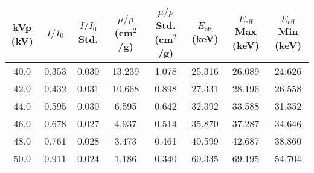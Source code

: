 \begin{tabular}{cccccccc}
\toprule
 kVp (kV) &  $I/I_0$ &  $I/I_0$ Std. &  $\mu/\rho$ (cm$^2$/g) &  $\mu/\rho$ Std. (cm$^2$/g) &  $E_{\text{eff}}$ (keV) &  $E_{\text{eff}}$ Max (keV) &  $E_{\text{eff}}$ Min (keV) \\
\midrule
     40.0 &    0.353 &         0.030 &                 13.239 &                       1.078 &                  25.316 &                      26.089 &                      24.626 \\
     42.0 &    0.432 &         0.031 &                 10.668 &                       0.898 &                  27.331 &                      28.196 &                      26.558 \\
     44.0 &    0.595 &         0.030 &                  6.595 &                       0.642 &                  32.392 &                      33.588 &                      31.352 \\
     46.0 &    0.678 &         0.027 &                  4.937 &                       0.514 &                  35.870 &                      37.287 &                      34.646 \\
     48.0 &    0.761 &         0.028 &                  3.473 &                       0.461 &                  40.599 &                      42.687 &                      38.860 \\
     50.0 &    0.911 &         0.024 &                  1.186 &                       0.340 &                  60.335 &                      69.195 &                      54.704 \\
\bottomrule
\end{tabular}
